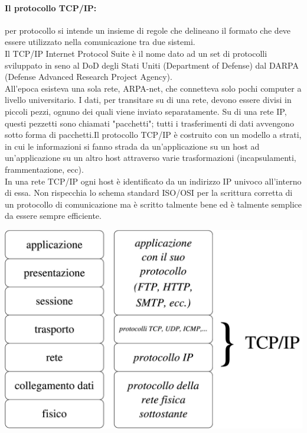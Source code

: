 \documentclass[a4paper]{report}
\begin{document}
\paragraph{Il protocollo TCP/IP:}
per protocollo si intende un insieme di regole che delineano il formato che deve essere utilizzato nella
comunicazione tra due sistemi.\\
Il TCP/IP Internet Protocol Suite è il nome dato ad un set di protocolli sviluppato in seno al
DoD degli Stati Uniti (Department of Defense) dal DARPA (Defense Advanced Research
Project Agency). \\All'epoca esisteva una sola rete, ARPA-net, che connetteva solo pochi
computer a livello universitario.
I dati, per transitare su di una rete, devono essere divisi in piccoli pezzi, ognuno dei quali
viene inviato separatamente. Su di una rete IP, questi pezzetti sono chiamati "pacchetti";
tutti i trasferimenti di dati avvengono sotto forma di pacchetti.Il protocollo TCP/IP è costruito
con un modello a strati, in cui le informazioni si fanno strada da un'applicazione su un host
ad un'applicazione su un altro host attraverso varie trasformazioni (incapsulamenti,
frammentazione, ecc).
\\In una rete TCP/IP ogni host è identificato da un indirizzo IP univoco all'interno di essa.
Non rispecchia lo schema standard ISO/OSI per la scrittura corretta di un protocollo di
comunicazione ma 
è scritto talmente bene ed è talmente semplice da essere sempre efficiente.\\
\begin{center}\includegraphics[scale=0.25]{tcpip.png}\end{center}
\end{document}
